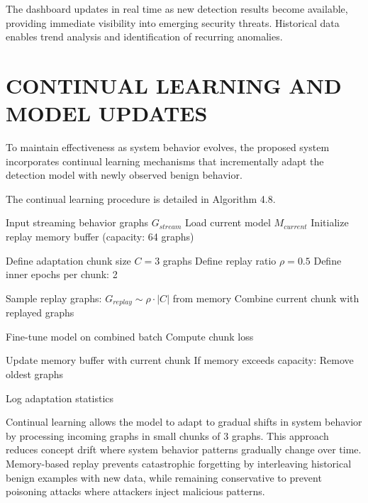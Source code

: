The dashboard updates in real time as new detection results become available, providing immediate visibility into emerging security threats. Historical data enables trend analysis and identification of recurring anomalies.



\section{\uppercase{CONTINUAL LEARNING AND MODEL UPDATES}}

To maintain effectiveness as system behavior evolves, the proposed system incorporates continual learning mechanisms that incrementally adapt the detection model with newly observed benign behavior.

The continual learning procedure is detailed in Algorithm 4.8.

\begin{algorithm}
\caption{Continual Learning and Model Adaptation}
\begin{algorithmic}[1]

\State Input streaming behavior graphs $G_{stream}$
\State Load current model $M_{current}$
\State Initialize replay memory buffer (capacity: 64 graphs)

\State Define adaptation chunk size $C = 3$ graphs
\State Define replay ratio $\rho = 0.5$
\State Define inner epochs per chunk: 2


\State Sample replay graphs: $G_{replay} \sim \rho \cdot |C|$ from memory
\State Combine current chunk with replayed graphs

\State Fine-tune model on combined batch
\State Compute chunk loss
\EndFor

\State Update memory buffer with current chunk
\State If memory exceeds capacity:
\State Remove oldest graphs

\EndFor

\State Log adaptation statistics

\end{algorithmic}
\end{algorithm}
\newpage
Continual learning allows the model to adapt to gradual shifts in system behavior by processing incoming graphs in small chunks of 3 graphs. This approach reduces concept drift where system behavior patterns gradually change over time. Memory-based replay prevents catastrophic forgetting by interleaving historical benign examples with new data, while remaining conservative to prevent poisoning attacks where attackers inject malicious patterns.



